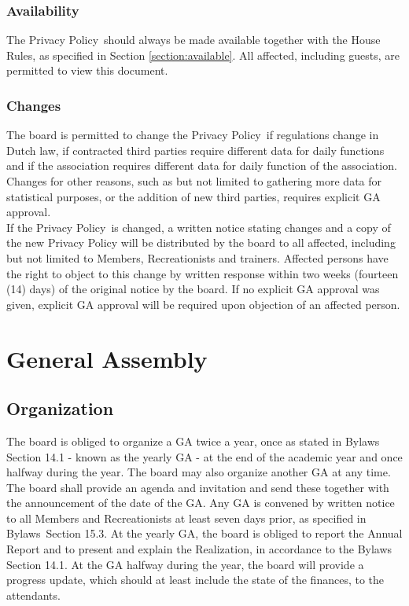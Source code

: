 \documentclass[a4paper]{article}
\newcommand{\Asta}{Bylaws} %
\newcommand{\Ahr}{House Rules} %
\newcommand{\Ajv}{Annual Report} %
\newcommand{\App}{Privacy Policy}
\begin{document}
\subsubsection{Availability}
The \App\ should always be made available together with the { \Ahr}, as specified in Section \ref{section:available}. All affected, including { guests}, are permitted to view this document.

\subsubsection{Changes}
The board is permitted to change the \App\ if regulations change in Dutch law, if contracted third parties require different data for daily functions and if the association requires different data for daily function of the association. Changes for other reasons, such as but not limited to gathering more data for statistical purposes, or the addition of new third parties, requires explicit { GA} approval. \\

If the \App\ is changed, a written notice stating changes and a copy of the new Privacy Policy will be distributed by the board to all affected, including but not limited to { Members}, { Recreationists} and trainers. Affected persons have the right to object to this change by written response within two weeks (fourteen (14) days) of the original notice by the board. If no explicit { GA} approval was given, explicit { GA} approval will be required upon objection of an affected person.


\section{General Assembly}
\subsection{Organization}
\label{section:yearlyGA}
The board is obliged to organize a { GA} twice a year, once as stated in { \Asta} Section 14.1 - known as the yearly { GA} - at the end of the academic year and once halfway during the year. The board may also organize another { GA} at any time. The board shall provide an agenda and invitation and send these together with the announcement of the date of the { GA}. Any { GA} is convened by written notice to all { Members} and { Recreationists} at least seven days prior, as specified in \Asta\ Section 15.3. At the yearly { GA}, the board is obliged to report the { \Ajv} and to present and explain the Realization, in accordance to the { \Asta} Section 14.1. At the { GA} halfway during the year, the board will provide a progress update, which should at least include the state of the finances, to the attendants. \\
\end{document}
